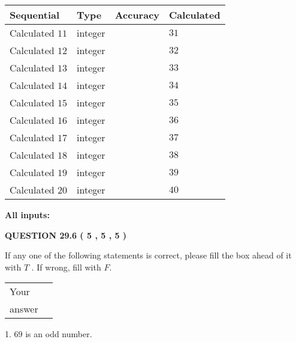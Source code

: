 \documentclass[12pt]{article}
\begin{document}
  
\noindent\begin{tabular}{|l|l|l|l|}
\hline
 Sequential & Type & Accuracy & Calculated \\ 
\hline
 
 
  Calculated $           11 $ & integer &  & 
  $ 31 $ 
 \\  \hline  
 
 
  Calculated $           12 $ & integer &  & 
  $ 32 $ 
 \\  \hline  
 
 
  Calculated $           13 $ & integer &  & 
  $ 33 $ 
 \\  \hline  
 
 
  Calculated $           14 $ & integer &  & 
  $ 34 $ 
 \\  \hline  
 
 
  Calculated $           15 $ & integer &  & 
  $ 35 $ 
 \\  \hline  
 
 
  Calculated $           16 $ & integer &  & 
  $ 36 $ 
 \\  \hline  
 
 
  Calculated $           17 $ & integer &  & 
  $ 37 $ 
 \\  \hline  
 
 
  Calculated $           18 $ & integer &  & 
  $ 38 $ 
 \\  \hline  
 
 
  Calculated $           19 $ & integer &  & 
  $ 39 $ 
 \\  \hline  
 
 
  Calculated $           20 $ & integer &  & 
  $ 40 $ 
 \\  \hline  
 \end{tabular}
   
   
   
   
\noindent\vspace{0.1in}\hspace{-0.08in} {\textbf{\Large{All inputs: }}}
   
   
  
\vspace{0.2in}
  
{\textbf{\Large{QUESTION
29.6 
 (           5 ,           5 ,           5 )
}}}
  
  
If any one of the following statements is correct, please fill the box ahead of it with $T$ .
If wrong, fill with $F$.
 
\noindent\begin{tabular}{|l|l|}\hline Your&\hspace{.2in} \\ answer&\hspace{.2in} \\ \hline \end{tabular}
1. $ %
69$ is an  %
odd number.
 
\end{document}
